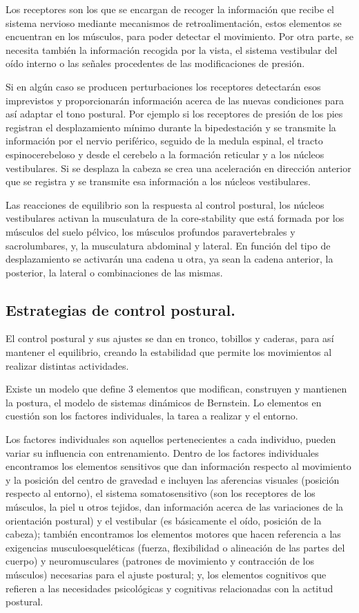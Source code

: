 Los receptores son los que se encargan de recoger la información que recibe el sistema nervioso mediante mecanismos de retroalimentación, estos elementos se encuentran en los músculos, para poder detectar el movimiento. Por otra parte, se necesita también la información recogida por la vista, el sistema vestibular del oído interno o las señales procedentes de las modificaciones de presión.

Si en algún caso se producen perturbaciones los receptores detectarán esos imprevistos y proporcionarán información acerca de las nuevas condiciones para así adaptar el tono postural. Por ejemplo si los receptores de presión de los pies registran el desplazamiento mínimo durante la bipedestación y se transmite la información por el nervio periférico, seguido de la medula espinal, el tracto espinocerebeloso y desde el cerebelo a la formación reticular y a los núcleos vestibulares. Si se desplaza la cabeza se crea una aceleración en dirección anterior que se registra y se transmite esa información a los núcleos vestibulares. 

Las reacciones de equilibrio son la respuesta al control postural, los núcleos vestibulares activan la musculatura de la core-stability que está formada por los músculos del suelo pélvico, los músculos profundos paravertebrales y sacrolumbares, y, la musculatura abdominal y lateral. En función del tipo de desplazamiento se activarán una cadena u otra, ya sean la cadena anterior, la posterior, la lateral o combinaciones de las mismas.

\subsection{Estrategias de control postural.} 
El control postural y sus ajustes se dan en tronco, tobillos y caderas, para así mantener el equilibrio, creando la estabilidad que permite los movimientos al realizar distintas actividades.

Existe un modelo que define 3 elementos que modifican, construyen y mantienen la postura, el modelo de sistemas dinámicos de Bernstein. Lo elementos en cuestión son los factores individuales, la tarea a realizar y el entorno. 

Los factores individuales son aquellos pertenecientes a cada individuo, pueden variar su influencia con entrenamiento. Dentro de los factores individuales encontramos los elementos sensitivos que dan información respecto al movimiento y la posición del centro de gravedad e incluyen las aferencias visuales (posición respecto al entorno), el sistema somatosensitivo (son los receptores de los músculos, la piel u otros tejidos, dan información acerca de las variaciones de la orientación postural) y el vestibular (es básicamente el oído, posición de la cabeza); también encontramos los elementos motores que hacen referencia a las exigencias musculoesqueléticas (fuerza, flexibilidad o alineación de las partes del cuerpo) y neuromusculares (patrones de movimiento y contracción de los músculos)  necesarias para el ajuste postural; y, los elementos cognitivos que refieren a las necesidades psicológicas y cognitivas relacionadas con la actitud postural.

